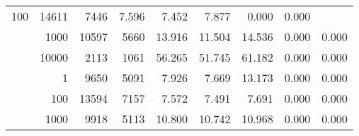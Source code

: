 \begin{table}
\begin{tabular}{rrrrrrrrr}
					\multirow{ 1 }{*}{ 100 } &
					
						
							    
							     14611  & 7446  
	                           & 7.596 & 7.452 & 7.877
	                           & 0.000 & 0.000  \\
	                
	            
					 &  
					 
					\multirow{ 1 }{*}{ 1000 } &
					
						
							    
							     10597  & 5660  
	                           & 13.916 & 11.504 & 14.536
	                           & 0.000 & 0.000  \\
	                
	            
					 &  
					 
					\multirow{ 1 }{*}{ 10000 } &
					
						
							    
							     2113  & 1061  
	                           & 56.265 & 51.745 & 61.182
	                           & 0.000 & 0.000  \\
	                
	            
	        
				\noalign{\smallskip}\hline
				\multirow{ 4 }{*}{ 250000 } &
				
					
					 
					\multirow{ 1 }{*}{ 1 } &
					
						
							    
							     9650  & 5091  
	                           & 7.926 & 7.669 & 13.173
	                           & 0.000 & 0.000  \\
	                
	            
					 &  
					 
					\multirow{ 1 }{*}{ 100 } &
					
						
							    
							     13594  & 7157  
	                           & 7.572 & 7.491 & 7.691
	                           & 0.000 & 0.000  \\
	                
	            
					 &  
					 
					\multirow{ 1 }{*}{ 1000 } &
					
						
							    
							     9918  & 5113  
	                           & 10.800 & 10.742 & 10.968
	                           & 0.000 & 0.000  \\
	                

\end{tabular}
\end{table}
